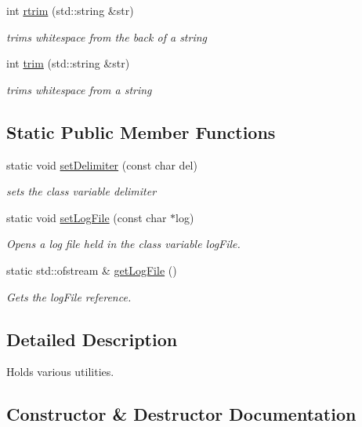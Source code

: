 \begin{DoxyCompactItemize}
int \mbox{\hyperlink{class_utilities_afffccc73f8e56740fdf789904bf268ee}{rtrim}} (std\+::string \&str)
\begin{DoxyCompactList}\small\item\em trims whitespace from the back of a string \end{DoxyCompactList}\item 
int \mbox{\hyperlink{class_utilities_ac71774c0324d441f542665f8f372a113}{trim}} (std\+::string \&str)
\begin{DoxyCompactList}\small\item\em trims whitespace from a string \end{DoxyCompactList}\end{DoxyCompactItemize}
\subsection*{Static Public Member Functions}
\begin{DoxyCompactItemize}
\item 
static void \mbox{\hyperlink{class_utilities_a5d0e249841a1ec89395a1810fa81354f}{set\+Delimiter}} (const char del)
\begin{DoxyCompactList}\small\item\em sets the class variable delimiter \end{DoxyCompactList}\item 
static void \mbox{\hyperlink{class_utilities_a4d03fd38f07e567277b82b8a0e030245}{set\+Log\+File}} (const char $\ast$log)
\begin{DoxyCompactList}\small\item\em Opens a log file held in the class variable log\+File. \end{DoxyCompactList}\item 
static std\+::ofstream \& \mbox{\hyperlink{class_utilities_aecd7de50b27a709a9810b17940074cad}{get\+Log\+File}} ()
\begin{DoxyCompactList}\small\item\em Gets the log\+File reference. \end{DoxyCompactList}\end{DoxyCompactItemize}


\subsection{Detailed Description}
Holds various utilities. 

\subsection{Constructor \& Destructor Documentation}
\mbox{\label{class_utilities_ab1676c9ce35cf347a73d16f1094e1271}} 
